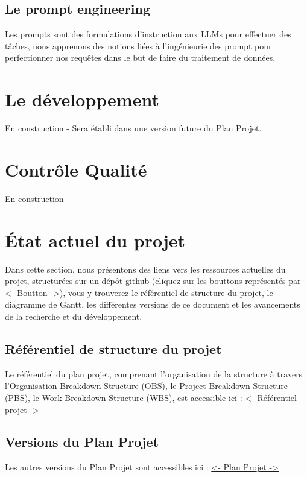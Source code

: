 \documentclass[11pt]{rapport_class}
\begin{document}
\section{Le prompt engineering}
Les prompts sont des formulations d'instruction aux LLMs pour effectuer des tâches, nous apprenons des notions liées à l'ingénieurie des prompt pour perfectionner nos requêtes dans le but de faire du traitement de données.



\chapter{Le développement}
\centerline{En construction - Sera établi dans une version future du Plan Projet.}

\chapter{Contrôle Qualité}
\centerline{En construction}


\chapter{État actuel du projet}
Dans cette section, nous présentons des liens vers les ressources actuelles du projet, structurées sur un dépôt github (cliquez sur les bouttons représentés par <- Boutton ->), vous y trouverez le référentiel de structure du projet, le diagramme de Gantt, les différentes versions de ce document et les avancements de la recherche et du développement.

\section{Référentiel de structure du projet}
Le référentiel du plan projet, comprenant l'organisation de la structure à travers l'Organisation Breakdown Structure (OBS), le Project Breakdown Structure (PBS), le Work Breakdown Structure (WBS), est accessible ici :
\href{https://github.com/fghjklm/Projet_M1_CheckThat-/tree/main/referentiel_projet}{<- Référentiel projet ->}

\section{Versions du Plan Projet}
Les autres versions du Plan Projet sont accessibles ici :
\href{https://github.com/fghjklm/Projet_M1_CheckThat-/tree/main/plan_projet}{<- Plan Projet ->}
\end{document}
